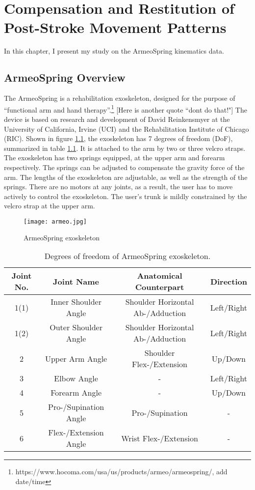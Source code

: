 \chapter{Compensation and Restitution of Post-Stroke Movement Patterns}
\label{cha:armeospring}

In this chapter, I present my study on the ArmeoSpring kinematics data.

\section{ArmeoSpring Overview}
\label{sec:overview}

The ArmeoSpring is a rehabilitation exoskeleton, designed for the purpose of ``functional arm and hand therapy''.\footnote{https://www.hocoma.com/usa/us/products/armeo/armeospring/, add date/time} [Here is another quote ``dont do that!"] The device is based on research and development of David Reinkensmyer at the University of California, Irvine (UCI) and the Rehabilitation Institute of Chicago (RIC). Shown in figure \ref{fig:armeo}, the exoskeleton has 7 degrees of freedom (DoF), summarized in table \ref{tab:devicedof}. It is attached to the arm by two or three velcro straps. The exoskeleton has two springs equipped, at the upper arm and forearm respectively. The springs can be adjusted to compensate the gravity force of the arm. The lengths of the exoskeleton are adjustable, as well as the strength of the springs. There are no motors at any joints, as a result, the user has to move actively to control the exoskeleton. The user's trunk is mildly constrained by the velcro strap at the upper arm. 

\begin{figure}
	\texttt{[image: armeo.jpg]}
	\centering
	\caption{ArmeoSpring exoskeleton}
	\label{fig:armeo}
\end{figure}

\begin{table}
	\begin{tabular}{c c c c}
	\hline
	Joint No. & Joint Name & Anatomical Counterpart & Direction \\
	\hline
	1(1) & Inner Shoulder Angle & Shoulder Horizontal Ab-/Adduction & Left/Right \\
	1(2) & Outer Shoulder Angle & Shoulder Horizontal Ab-/Adduction & Left/Right \\
	2 & Upper Arm Angle & Shoulder Flex-/Extension & Up/Down \\
	3 & Elbow Angle & - & Left/Right \\
	4 & Forearm Angle & - & Up/Down \\
	5 & Pro-/Supination Angle & Pro-/Supination & - \\ 
	6 & Flex-/Extension Angle & Wrist Flex-/Extension & - \\
	\hline
	\end{tabular}
	\caption{Degrees of freedom of ArmeoSpring exoskeleton.}
	\label{tab:devicedof}
\end{table}

